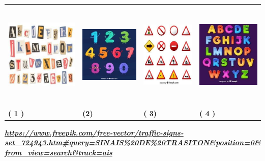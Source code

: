 \begin{escola}
\begin{longtable}[]{@{}llll@{}}
\toprule
\includegraphics[width=1.51042in,height=2.00000in]{media/image183.jpg} &
\includegraphics[width=1.19792in,height=1.68472in]{media/image184.jpg} &
\includegraphics[width=1.08681in,height=1.72778in]{media/image185.jpg} &
\includegraphics[width=1.30208in,height=1.73819in]{media/image186.jpg}\tabularnewline
\textbf{( 1 )} & \textbf{(2)} & \textbf{( 3)} & \textbf{( 4
)}\tabularnewline
\bottomrule
\end{longtable}

\href{https://www.freepik.com/free-vector/traffic-signs-set_724943.htm\#query=SINAIS\%20DE\%20TRASITON\&position=0\&from_view=search\&track=ais}{\textbf{\emph{https://www.freepik.com/free-vector/traffic-signs-set\_724943.htm\#query=SINAIS\%20DE\%20TRASITON\&position=0\&from\_view=search\&track=ais}}}


\end{escola}
